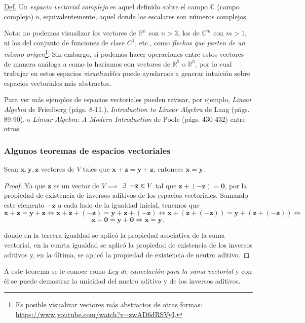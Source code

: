 \documentclass[12pt]{article}
\newenvironment{teorema}[2][Teorema]{\begin{trivlist}
\item[\hskip \labelsep {\bfseries #1}\hskip \labelsep {\bfseries #2.}]}{\end{trivlist}}
\begin{document}
\vspace{1.5mm} 
\begin{tcolorbox}
\underline{Def.} Un \textit{espacio vectorial complejo} es aquel definido sobre el campo $\mathbb{C}$ (campo complejo) o, equivalentemente, aquel donde los escalares son números complejos.
\end{tcolorbox}{}

Nota: no podemos visualizar los vectores de $\mathbb{R}^n$ con $n>3$, los de $\mathbb{C}^m$ con $m>1$, ni los del conjunto de funciones de clase $C^1$, etc., como \emph{flechas que parten de un mismo origen}\footnote{Es posible visualizar vectores más abstractos de otras formas: \url{https://www.youtube.com/watch?v=zwAD6dRSVyI}.}. Sin embargo, sí podemos hacer operaciones entre estos vectores de manera análoga a como lo haríamos con vectores de $\mathbb{R}^2$ o $\mathbb{R}^3$, por lo cual trabajar en estos espacios \emph{visualizables} puede ayudarnos a generar intuición sobre espacios vectoriales más abstractos.

\vspace{3mm}
Para ver más ejemplos de espacios vectoriales pueden revisar, por ejemplo, \textit{Linear Algebra} de Friedberg (págs. 8-11.), \textit{Introduction to Linear Algebra} de Lang (págs. 89-90). o \textit{Linear Algebra: A Modern Introduction} de Poole (págs. 430-432) entre otros.

\subsubsection{Algunos teoremas de espacios vectoriales} \label{Teo:Espacios_vectoriales} 

\begin{teorema} {1.2.3.1}
Sean $\mathbf{x},\mathbf{y},\mathbf{z}$ vectores de $V$ tales que $\mathbf{x}+\mathbf{z}=\mathbf{y}+\mathbf{z}$, entonces $\mathbf{x}=\mathbf{y}$.

\begin{proof}
Ya que $\mathbf{z}$ es un vector de $V\implies$ $\exists\hspace{2mm} \mathbf{-z}\in V$ tal que $\mathbf{z} + (-\mathbf{z}) = \mathbf{0}$, por la propiedad de existencia de inversos aditivos de los espacios vectoriales. Sumando este elemento $-\mathbf{z}$ a cada lado de la igualdad inicial, tenemos que $$\mathbf{x}+\mathbf{z}=\mathbf{y}+\mathbf{z}\iff\mathbf{x}+\mathbf{z}+ (-\mathbf{z})=\mathbf{y}+\mathbf{z}+ (-\mathbf{z})\iff\mathbf{x}+(\mathbf{z}+ (-\mathbf{z}))=\mathbf{y}+(\mathbf{z}+ (-\mathbf{z}))\iff$$ $$ \mathbf{x}+\mathbf{0}=\mathbf{y}+\mathbf{0}\iff\mathbf{x}=\mathbf{y},$$

\noindent donde en la tercera igualdad se aplicó la propiedad asociativa de la suma vectorial, en la cuarta igualdad se aplicó la propiedad de existencia de los inversos aditivos y, en la última, se aplicó la propiedad de existencia de neutro aditivo.
\end{proof}
A este teorema se le conoce como \emph{Ley de cancelación para la suma vectorial} y con él se puede demostrar la unicidad del nuetro aditivo y de los inversos aditivos.
\end{teorema}
\end{document}
